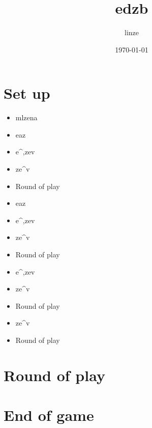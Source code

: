 \documentclass{article}%
\title{edzb}%
\author{linze}%
\date{\today}%
\begin{document}
%
\pagestyle{empty}%
\normalsize%
\maketitle%
\section{ Set up
}%
\label{sec:Setup}%
\begin{itemize}%
\item%
 mlzena
%
\item%
 eaz
%
\item%
 e\^{},zev
%
\item%
 ze\^{}v
%
\item%
 Round of play
%
\end{itemize}%
\begin{itemize}%
\item%
 eaz
%
\item%
 e\^{},zev
%
\item%
 ze\^{}v
%
\item%
 Round of play
%
\end{itemize}%
\begin{itemize}%
\item%
 e\^{},zev
%
\item%
 ze\^{}v
%
\item%
 Round of play
%
\end{itemize}%
\begin{itemize}%
\item%
 ze\^{}v
%
\item%
 Round of play
%
\end{itemize}

%
\section{ Round of play
}%
\label{sec:Roundofplay}%

%
\section{ End of game}%
\label{sec:Endofgame}%

%
\end{document}
